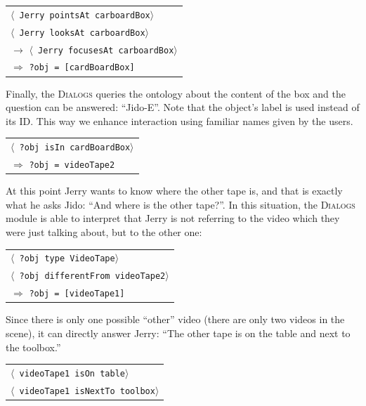 \documentclass[preprint,3p,times]{elsarticle}
\newcommand{\concept}[1]{{\small \texttt{#1}}}
\newcommand{\stmt}[1]{{\footnotesize \tt $\langle$ #1\relax$\rangle$}}
\begin{document}
\begin{center}
\begin{tabular}{l}
\stmt{Jerry pointsAt carboardBox}\\
\stmt{Jerry looksAt carboardBox}\\
$\to$ \stmt{Jerry focusesAt carboardBox}\\
\hspace{0.7cm}$\Rightarrow$ {\tt ?obj = [cardBoardBox]}
\end{tabular}
\end{center}

Finally, the \textsc{Dialogs} queries the ontology about the content of the box
and the question can be answered: ``Jido-E''. Note that the object's label is
used instead of its ID. This way we enhance interaction using familiar names
given by the users.

\begin{center}
\begin{tabular}{l}
\stmt{?obj isIn cardBoardBox}\\
\hspace{0.7cm}$\Rightarrow$ \concept{?obj = videoTape2}\\
\end{tabular}
\end{center}

At this point Jerry wants to know where the other tape is, and that is exactly
what he asks Jido: ``And where is the other tape?''. In this situation, the
\textsc{Dialogs} module is able to interpret that Jerry is not referring to the
video which they were just talking about, but to the other one:

\begin{center}
\begin{tabular}{l}
\stmt{?obj type VideoTape}\\
\stmt{?obj differentFrom videoTape2}\\
\hspace{0.7cm}$\Rightarrow$ \concept{?obj = [videoTape1]}
\end{tabular}
\end{center}

Since there is only one possible ``other'' video (there are only two videos in
the scene), it can directly answer Jerry: ``The other tape is on the table and
next to the toolbox.''

\begin{center}
\begin{tabular}{l}
\stmt{videoTape1 isOn table}\\
\stmt{videoTape1 isNextTo toolbox}
\end{tabular}
\end{center}
\end{document}
